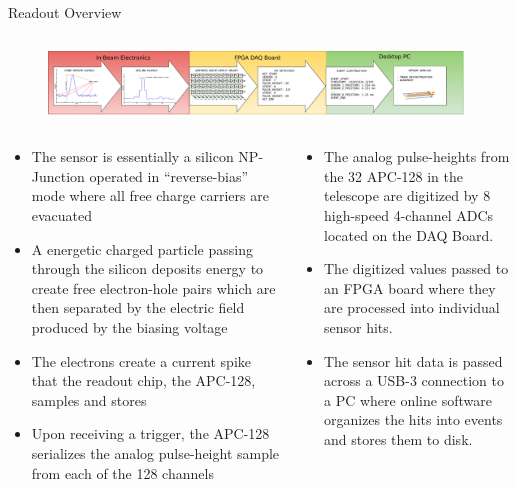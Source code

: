 \documentclass[final]{beamer}
\newlength{\onecolwide}
\begin{document}
\begin{frame}[t]
\begin{block}{Readout Overview}
  \begin{columns}[t]
    \begin{column}{\paperwidth}
      \begin{figure}
        \centering
        \includegraphics[width=0.98\textwidth]{figures/Telescope_Data_Flow}
      \end{figure}
    \end{column}
  \end{columns}
  \begin{columns}[t]
    \begin{column}{\onecolwide}
      \small
      \begin{itemize}
      \itemsep0em 
        \item The sensor is essentially a silicon NP-Junction operated in ``reverse-bias'' mode where all free charge carriers are evacuated
        \item A energetic charged particle passing through the silicon deposits energy to create free electron-hole pairs which are then separated by the electric field produced by the biasing voltage
        \item The electrons create a current spike that the readout chip, the APC-128, samples and stores
        \item Upon receiving a trigger, the APC-128 serializes the analog pulse-height sample from each of the 128 channels
      \end{itemize}
    \end{column}
    \begin{column}{\onecolwide}
      \small
      \begin{itemize}
      \itemsep0em 
        \item The analog pulse-heights from the 32 APC-128 in the telescope are digitized by 8 high-speed 4-channel ADCs located on the DAQ Board.
        \item The digitized values passed to an FPGA board where they are processed into individual sensor hits.
        \item The sensor hit data is passed across a USB-3 connection to a PC where online software organizes the hits into events and stores them to disk.
      \end{itemize}

\end{column}
\end{columns}
\end{block}
\end{frame}
\end{document}

